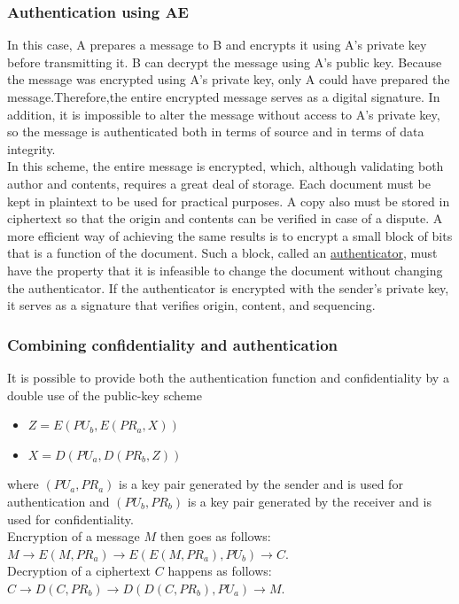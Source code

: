 \documentclass[12pt]{article}
\begin{document}
 \subsubsection{Authentication using AE}
 In this case, A prepares a message to B and encrypts it using A’s private key before transmitting it. B can decrypt the message using A’s public key. Because the message was encrypted using A’s private key, only A could have prepared the message.Therefore,the entire encrypted message serves as a digital signature. In addition, it is impossible to alter the message without access to A’s private key, so the message is authenticated both in terms of source and in terms of data integrity.\\
 In this scheme, the entire message is encrypted, which, although validating both author and contents, requires a great deal of storage. Each document must be kept in plaintext to be used for practical purposes. A copy also must be stored in ciphertext so that the origin and contents can be verified in case of a dispute. A more efficient way of achieving the same results is to encrypt a small block of bits that is a function of the document. Such a block, called an \underline{authenticator}, must have the property that it is infeasible to change the document without changing the authenticator. If the authenticator is encrypted with the sender’s private key, it serves as a signature that verifies origin, content, and sequencing.
 
 \subsubsection{Combining confidentiality and authentication}
 It is possible to provide both the authentication function and confidentiality by a double use of the public-key scheme
 \begin{itemize}
 	\item $Z = E(PU_b,E(PR_a,X))$
 	\item $X = D(PU_a,D(PR_b,Z))$
 \end{itemize} 
 where $(PU_a, PR_a)$ is a key pair generated by the sender and is used for authentication and $(PU_b, PR_b)$ is a key pair generated by the receiver and is used for confidentiality.\\
 Encryption of a message $M$ then goes as follows: $M \rightarrow E(M, PR_a) \rightarrow E(E(M, PR_a), PU_b) \rightarrow C$.\\
 Decryption of a ciphertext $C$ happens as follows: $C \rightarrow D(C, PR_b) \rightarrow D(D(C, PR_b), PU_a) \rightarrow M$.
 
\end{document}
